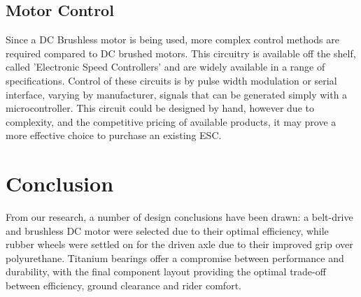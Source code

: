 \documentclass[journal,10pt]{IEEEtran}
\begin{document}
    \subsection{Motor Control}
    		Since a DC Brushless motor is being used, more complex control methods are required compared to DC brushed motors.
    		This circuitry is available off the shelf, called 'Electronic Speed Controllers' and are widely available in a range of specifications.
    		Control of these circuits is by pulse width modulation or serial interface, varying by manufacturer, signals that can be generated simply with a microcontroller.
    		This circuit could be designed by hand, however due to complexity, and the competitive pricing of available products, it may prove a more effective choice to purchase an existing ESC.
\section{Conclusion}
From our research, a number of design conclusions have been drawn: a belt-drive and brushless DC motor were selected due to their optimal efficiency, while rubber wheels were settled on for the driven axle due to their improved grip over polyurethane. Titanium bearings offer a compromise between performance and durability, with the final component layout providing the optimal trade-off between efficiency, ground clearance and rider comfort.



\end{document}
